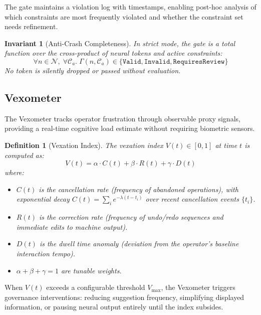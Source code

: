 \documentclass[11pt,a4paper]{article}
\newtheorem{definition}{Definition}[section]
\newtheorem{invariant}{Invariant}[section]
\begin{document}
The gate maintains a violation log with timestamps, enabling
post-hoc analysis of which constraints are most frequently violated
and whether the constraint set needs refinement.

\begin{invariant}[Anti-Crash Completeness]\label{inv:anticrash}
In strict mode, the gate is a total function over the cross-product
of neural tokens and active constraints:
\[
  \forall n \in \mathcal{N},\; \forall \mathcal{C}_a.\;
    \Gamma(n, \mathcal{C}_a) \in
    \{\texttt{Valid}, \texttt{Invalid}, \texttt{RequiresReview}\}
\]
No token is silently dropped or passed without evaluation.
\end{invariant}

\subsection{Vexometer}

The Vexometer tracks operator frustration through observable proxy
signals, providing a real-time cognitive load estimate without
requiring biometric sensors.

\begin{definition}[Vexation Index]\label{def:vexometer}
The vexation index $V(t) \in [0, 1]$ at time $t$ is computed as:
\[
  V(t) = \alpha \cdot C(t) + \beta \cdot R(t) + \gamma \cdot D(t)
\]
where:
\begin{itemize}
  \item $C(t)$ is the cancellation rate (frequency of abandoned
    operations), with exponential decay $C(t) = \sum_{i} e^{-\lambda(t - t_i)}$
    over recent cancellation events $\{t_i\}$.
  \item $R(t)$ is the correction rate (frequency of undo/redo
    sequences and immediate edits to machine output).
  \item $D(t)$ is the dwell time anomaly (deviation from the
    operator's baseline interaction tempo).
  \item $\alpha + \beta + \gamma = 1$ are tunable weights.
\end{itemize}
\end{definition}

When $V(t)$ exceeds a configurable threshold $V_{\max}$, the
Vexometer triggers governance interventions: reducing suggestion
frequency, simplifying displayed information, or pausing neural
output entirely until the index subsides.
\end{document}
